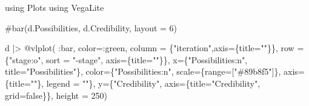 \documentclass[
  letterpaper,
  DIV=11,
  numbers=noendperiod]{scrreprt}
\newenvironment{Shaded}{\begin{snugshade}}{\end{snugshade}}
\newcommand{\BuiltInTok}[1]{\textcolor[rgb]{0.00,0.23,0.31}{#1}}
\newcommand{\CommentTok}[1]{\textcolor[rgb]{0.37,0.37,0.37}{#1}}
\newcommand{\ConstantTok}[1]{\textcolor[rgb]{0.56,0.35,0.01}{#1}}
\newcommand{\FloatTok}[1]{\textcolor[rgb]{0.68,0.00,0.00}{#1}}
\newcommand{\ImportTok}[1]{\textcolor[rgb]{0.00,0.46,0.62}{#1}}
\newcommand{\NormalTok}[1]{\textcolor[rgb]{0.00,0.23,0.31}{#1}}
\newcommand{\OperatorTok}[1]{\textcolor[rgb]{0.37,0.37,0.37}{#1}}
\newcommand{\PreprocessorTok}[1]{\textcolor[rgb]{0.68,0.00,0.00}{#1}}
\newcommand{\StringTok}[1]{\textcolor[rgb]{0.13,0.47,0.30}{#1}}
\begin{document}
\begin{Shaded}
\begin{Highlighting}[]
\ImportTok{using} \BuiltInTok{Plots}
\ImportTok{using} \BuiltInTok{VegaLite}

\CommentTok{\#bar(d.Possibilities, d.Credibility, layout = 6)}

\NormalTok{d }\OperatorTok{|\textgreater{}}
\PreprocessorTok{@vlplot}\NormalTok{(}
  \OperatorTok{:}\NormalTok{bar,}
\NormalTok{  color}\OperatorTok{=:}\NormalTok{green,}
\NormalTok{  column }\OperatorTok{=}\NormalTok{ \{}\StringTok{"iteration"}\NormalTok{,axis}\OperatorTok{=}\NormalTok{\{title}\OperatorTok{=}\StringTok{""}\NormalTok{\}\},}
\NormalTok{  row }\OperatorTok{=}\NormalTok{ \{}\StringTok{"stage:o"}\NormalTok{, sort }\OperatorTok{=} \StringTok{"{-}stage"}\NormalTok{, axis}\OperatorTok{=}\NormalTok{\{title}\OperatorTok{=}\StringTok{""}\NormalTok{\}\},}
\NormalTok{  x}\OperatorTok{=}\NormalTok{\{}\StringTok{"Possibilities:n"}\NormalTok{, title}\OperatorTok{=}\StringTok{"Possibilities"}\NormalTok{\},}
\NormalTok{  color}\OperatorTok{=}\NormalTok{\{}\StringTok{"Possibilities:n"}\NormalTok{, scale}\OperatorTok{=}\NormalTok{\{range}\OperatorTok{=}\NormalTok{[}\StringTok{"\#89b8f5"}\NormalTok{]\}, axis}\OperatorTok{=}\NormalTok{\{title}\OperatorTok{=}\StringTok{""}\NormalTok{\}, legend }\OperatorTok{=} \StringTok{""}\NormalTok{\},}
\NormalTok{  y}\OperatorTok{=}\NormalTok{\{}\StringTok{"Credibility"}\NormalTok{, axis}\OperatorTok{=}\NormalTok{\{title}\OperatorTok{=}\StringTok{"Credibility"}\NormalTok{, grid}\OperatorTok{=}\ConstantTok{false}\NormalTok{\}\},}
\NormalTok{  height }\OperatorTok{=} \FloatTok{250}\NormalTok{)}
\end{Highlighting}
\end{Shaded}
\end{document}

